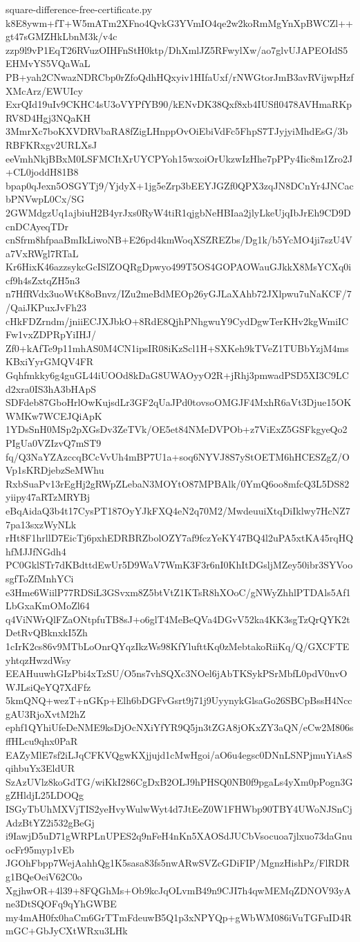 \documentclass[11pt]{article}
\theoremstyle{definition}
\theoremstyle{remark}
\begin{document}
\begin{filecontents*}[overwrite]{square-difference-free-certificate.py}
k8E8ywm+fT+W5mATm2XFno4QvkG3YVmIO4qe2w2koRmMgYnXpBWCZl++gt47sGMZHkLbnM3k/v4c
zzp9l9vP1EqT26RVuzOIHFnStH0ktp/DhXmlJZ5RFwylXw/ao7glvUJAPEOIdS5EHMvYS5VQaWaL
PB+yah2CNwazNDRCbp0rZfoQdhHQxyiv1HIfaUxf/rNWGtorJmB3avRVijwpHzfXMcArz/EWUIcy
ExrQId19uIv9CKHC4sU3oVYPfYB90/kENvDK38Qxf8xb4IUSfl0478AVHmaRKpRV8D4Hgj3NQaKH
3MmrXc7boKXVDRVbaRA8fZigLHnppOvOiEbiVdFc5FhpS7TJyjyiMhdEsG/3bRBFKRxgv2URLXsJ
eeVmhNkjBBxM0LSFMCItXrUYCPYoh15wxoiOrUkzwIzHhe7pPPy4Iic8m1Zro2J+CL0joddH81B8
bpap0qJexn5OSGYTj9/YjdyX+1jg5eZrp3bEEYJGZf0QPX3zqJN8DCnYr4JNCacbPNVwpL0Cx/SG
2GWMdgzUq1ajbiuH2B4yrJxs0RyW4tiR1qjgbNeHBIaa2jlyLkeUjqIbJrEh9CD9DcnDCAyeqTDr
cnSfrm8hfpaaBmIkLiwoNB+E26pd4kmWoqXSZREZbs/Dg1k/b5YcMO4ji7szU4Va7VxRWgl7RTaL
Kr6HixK46azzsykcGcISlZOQRgDpwyo499T5OS4GOPAOWauGJkkX8MsYCXq0icf9h4sZxtqZH5n3
n7HfRVdx3uoWtK8oBnvz/IZu2meBdMEOp26yGJLaXAhb72JXlpwu7uNaKCF/7/QaiJKPuxJvFh23
cHkFDZrndm/jniiECJXJbkO+8RdE8QjhPNhgwuY9CydDgwTerKHv2kgWmiICFw1vxZDPRpYiIHJ/
Zf0+kAfTe9p11mhAS0M4CN1ipsIR08iKzScl1H+SXKeh9kTVeZ1TUBbYzjM4msKBxiYyrGMQV4FR
Gqhfmkky6g4guGL44iUOOd8kDaG8UWAOyyO2R+jRhj3pmwadPSD5XI3C9LCd2xra0IS3hA3bHApS
SDFdeb87GboHrlOwKujsdLr3GF2qUaJPd0tovsoOMGJF4MxhR6aVt3Djue15OKWMKw7WCEJQiApK
1YDsSnH0MSp2pXGsDv3ZeTVk/OE5et84NMeDVPOb+z7ViExZ5GSFkgyeQo2PIgUa0VZIzvQ7mST9
fq/Q3NaYZAzccqBCcVvUh4mBP7U1a+soq6NYVJ8S7yStOETM6hHCESZgZ/OVp1sKRDjebzSeMWhu
RxbSuaPv13rEgHj2gRWpZLebaN3MOYtO87MPBAlk/0YmQ6oo8mfcQ3L5DS82yiipy47aRTzMRYBj
eBqAidaQ3b4t17CysPT187OyYJkFXQ4eN2q70M2/MwdeuuiXtqDiIklwy7HcNZ77pa13sxzWyNLk
rHt8F1hrllD7EicTj6pxhEDRBRZbolOZY7af9fczYeKY47BQ4l2uPA5xtKA45rqHQhfMJJfNGdh4
PC0GklSTr7dKBdttdEwUr5D9WaV7WmK3F3r6nI0KhItDGsljMZey50ibr3SYVoosgfToZfMnhYCi
e3Hme6WiilP77RDSiL3GSvxm8Z5btVtZ1KTsR8hXOoC/gNWyZhhlPTDAls5Af1LbGxaKmOMoZl64
q4ViNWrQlFZaONtpfuTB8sJ+o6glT4MeBeQVa4DGvV52ka4KK3sgTzQrQYK2tDetRvQBknxkI5Zh
1cIrK2cs86v9MTbLoOnrQYqzIkzWs98KfYlufttKq0zMebtakoRiiKq/Q/GXCFTEyhtqzHwzdWsy
EEAHuuwhGIzPbi4xTzSU/O5ns7vhSQXc3NOel6jAbTKSykPSrMbfL0pdV0nvOWJLsiQeYQ7XdFfz
5kmQNQ+wezT+nGKp+Elh6bDGFvGsrt9j71j9UyynykGlsaGo26SBCpBssH4NccgAU3RjoXvtM2hZ
ephf1QYhiUfeDeNME9ksDjOcNXiYfYR9Q5jn3tZGA8jOKxZY3aQN/eCw2M806sffHLcu9qhx0PaR
EAZyMlE7sf2iLJqCFKVQgwKXjjujd1cMwHgoi/aO6u4egsc0DNnLSNPjmuYiAsSqihbuYx3EldUR
SzAzUVlz8koGdTG/wiKkI286CgDxB2OLJ9hPHSQ0NB0f9pgaLs4yXm0pPogn3GgZHldjL25LDOQg
ISGyTbUhMXVjTIS2yeHvyWulwWyt4d7JtEeZ0W1FHWbp90TBY4UWoNJSnCjAdzBtYZ2i532gBeGj
i9IawjD5uD71gWRPLnUPES2q9nFeH4nKn5XAOSdJUCbVsocuoa7jlxuo73daGnuocFr95myp1vEb
JGOhFbpp7WejAahhQg1K5sasa83fs5nwARwSVZcGDiFIP/MgnzHishPz/FlRDRg1BQeOeiV62C0o
XgjhwOR+4l39+8FQGhMs+Ob9kcJqOLvmB49n9CJI7h4qwMEMqZDNOV93yAne3DtSQOFq9qYhGWBE
my4mAH0fx0haCm6GrTTmFdeuwB5Q1p3xNPYQp+gWbWM086iVuTGFuID4RmGC+GbJyCXtWRxu3LHk

\end{filecontents*}
\end{document}
